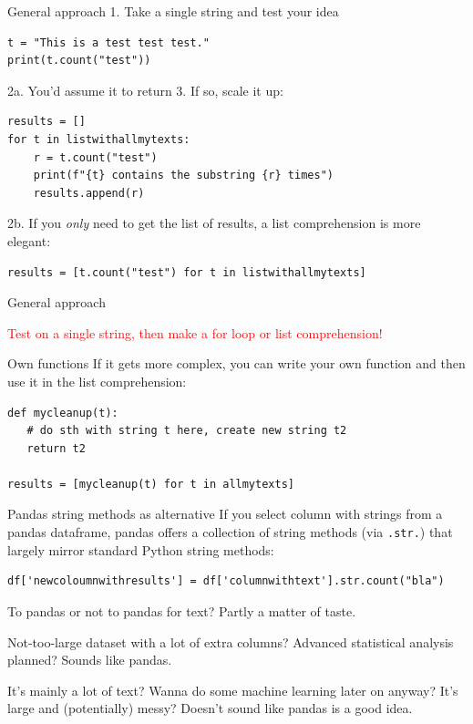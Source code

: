 \documentclass[handout]{beamer}
\begin{document}
\begin{frame}[fragile]{General approach}
1. Take a single string and test your idea
\begin{lstlisting}
t = "This is a test test test."
print(t.count("test"))
\end{lstlisting}
2a. You'd assume it to return 3. If so, scale it up:
\begin{lstlisting}
results = []
for t in listwithallmytexts:
    r = t.count("test")
    print(f"{t} contains the substring {r} times")
    results.append(r)
\end{lstlisting}

2b. If you \emph{only} need to get the list of results, a list comprehension is more elegant:
\begin{lstlisting}
results = [t.count("test") for t in listwithallmytexts]
\end{lstlisting}


\end{frame}


\begin{frame}[fragile]{General approach}
\Large

\textcolor{red}{Test on a single string, then make a for loop or list comprehension!}

\pause

\normalsize

\begin{alertblock}{Own functions}
If it gets more complex, you can write your own function and then use it in the list comprehension:
\begin{lstlisting}
def mycleanup(t):
   # do sth with string t here, create new string t2
   return t2
  
results = [mycleanup(t) for t in allmytexts]
\end{lstlisting}
\end{alertblock}
\end{frame}


\begin{frame}[fragile]{Pandas string methods as alternative}
If you select column with strings from a pandas dataframe, pandas offers a collection of string methods (via \texttt{.str.}) that largely mirror standard Python string methods:

\begin{lstlisting}
df['newcoloumnwithresults'] = df['columnwithtext'].str.count("bla")
\end{lstlisting} 


\pause

\begin{alertblock}{To pandas or not to pandas for text?}
Partly a matter of taste. 

Not-too-large dataset with a lot of extra columns? Advanced statistical analysis planned? Sounds like pandas.

It's mainly a lot of text? Wanna do some machine learning later on anyway? It's large and (potentially) messy? Doesn't sound like pandas is a good idea.
\end{alertblock}

\end{frame}
\end{document}
